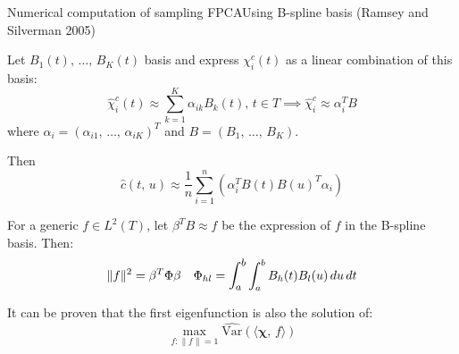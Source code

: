 \begin{algorithm}{Numerical computation of sampling FPCA}{}Using B-spline basis
    (Ramsey and Silverman 2005)

    Let $B_1(t),\, \dots,\, B_K(t)$ basis and express $\chi_i^c(t)$ as a linear combination of
    this basis:
    \begin{equation*}
        \hat \chi_i^c(t) \approx \sum_{k=1}^K \alpha_{ik} B_k(t),\,t \in T \implies
            \hat\chi_i^c \approx \alpha_i^T B
    \end{equation*}
    where $\alpha_i = (\alpha_{i1},\, \dots,\, \alpha_{iK})^T$ and $B = (B_1,\, \dots,\, B_K)$.

    Then
    \begin{equation*}
        \hat c(t,\,u) \approx \frac{1}{n} \sum_{i=1}^n \left(
            \alpha_i^T B(t) B(u)^T \alpha_i
        \right)
    \end{equation*}

    For a generic $f \in L^2(T)$, let $\beta^T B\approx f$ be the expression of $f$
    in the B-spline basis. Then:
    \begin{equation*}
        \lVert f \rVert^2 = \beta^T \Phi \beta \quad
        \Phi_{hl} = \mathlarger{\int_a^b} \int_a^b B_h(t) B_l(u) \,du \,dt
    \end{equation*}

    It can be proven that the first eigenfunction is also the solution of:
    \begin{equation*}
        \max_{f:\lVert f \rVert = 1} \widehat{\text{Var}} \left( \langle \boldsymbol \chi,\, f \rangle \right)
    \end{equation*}


\end{algorithm}
